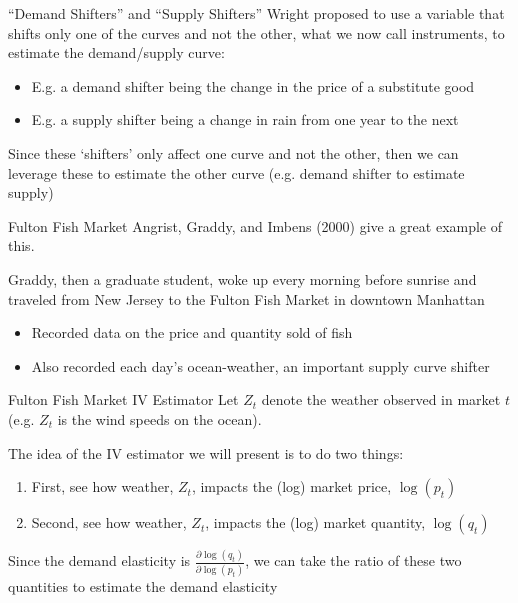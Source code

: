 \documentclass[aspectratio=169,t,11pt,table]{beamer}
\begin{document}
\begin{frame}{``Demand Shifters'' and ``Supply Shifters''}
  Wright proposed to use a variable that shifts only one of the curves and not the other, what we now call instruments, to estimate the demand/supply curve:

  \begin{itemize}
    \item E.g. a demand shifter being the change in the price of a substitute good
    \item E.g. a supply shifter being a change in rain from one year to the next
  \end{itemize}

  \pause
  \bigskip 
  Since these `shifters' only affect one curve and not the other, then we can leverage these to estimate the other curve (e.g. demand shifter to estimate supply) 
\end{frame}

\begin{frame}{Fulton Fish Market}
  Angrist, Graddy, and Imbens (2000) give a great example of this. 

  \bigskip
  Graddy, then a graduate student, woke up every morning before sunrise and traveled from New Jersey to the Fulton Fish Market in downtown Manhattan
  \begin{itemize}
    \item Recorded data on the price and quantity sold of fish
    
    \item Also recorded each day's ocean-weather, an important supply curve shifter
  \end{itemize}
\end{frame}


\begin{frame}{Fulton Fish Market IV Estimator}
  Let $Z_t$ denote the weather observed in market $t$ (e.g. $Z_t$ is the wind speeds on the ocean). 
  
  \bigskip
  The idea of the IV estimator we will present is to do two things:
  \begin{enumerate}
    \item First, see how weather, $Z_t$, impacts the (log) market price, $\log(p_t)$
    
    \item Second, see how weather, $Z_t$, impacts the (log) market quantity, $\log(q_t)$
  \end{enumerate}

  \bigskip
  Since the demand elasticity is $\frac{\partial \log(q_t)}{\partial \log(p_t)}$, we can take the ratio of these two quantities to estimate the demand elasticity
\end{frame}
\end{document}
